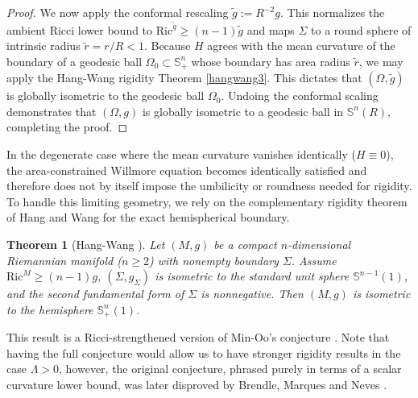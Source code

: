 \documentclass[12pt,a4paper]{amsart}
\theoremstyle{plain}
\newtheorem{theorem}{Theorem}[section]
\theoremstyle{definition}
\begin{document}
\begin{proof}
We now apply the conformal rescaling $\tilde{g} := R^{-2}g$. This normalizes the ambient Ricci lower bound to $\mathrm{Ric}^{\tilde{g}} \ge (n-1)\tilde{g}$ and maps $\Sigma$ to a round sphere of intrinsic radius $\tilde{r} = r/R < 1$. Because $H$  agrees with the mean curvature of the boundary of a geodesic ball $\Omega_0 \subset \mathbb{S}^n_+$ whose boundary has area radius $\tilde{r}$, we may apply the Hang-Wang rigidity Theorem \ref{hangwang3}. This dictates that $(\Omega, \tilde{g})$ is globally isometric to the  geodesic ball $\Omega_0$. Undoing the conformal scaling demonstrates that $(\Omega, g)$ is globally isometric to a geodesic ball in $\mathbb{S}^n(R)$, completing the proof.
\end{proof}


In the degenerate case where the mean curvature vanishes identically ($H \equiv 0$),  the area-constrained Willmore equation becomes identically satisfied and therefore does not by itself impose the umbilicity or roundness needed for rigidity.  To handle this limiting geometry, we rely on the complementary rigidity theorem of Hang and Wang for the exact hemispherical boundary.
\begin{theorem}[Hang-Wang {\cite[Theorem 2]{hang2009rigidity}}]\label{hangwang}
Let $(M,g)$ be a compact $n$-dimensional Riemannian manifold ($n\ge2$) with nonempty boundary $\Sigma$. Assume $\mathrm{Ric}^M \ge (n-1)g$, $(\Sigma,g_\Sigma)$ is isometric to the standard unit sphere $\mathbb{S}^{n-1}(1)$, and the second fundamental form of $\Sigma$ is nonnegative. Then $(M,g)$ is isometric to the hemisphere $\mathbb{S}^n_+(1)$.
\end{theorem}
This result is a Ricci-strengthened version of Min-Oo’s conjecture \cite[Theorem 4]{min1998scalar}. Note that having the full conjecture would allow us to have stronger rigidity results in the case $\Lambda >0$, however, the original conjecture, phrased purely in terms of a scalar curvature lower bound, was later disproved  by Brendle, Marques and Neves \cite{brendle2011deformations}.
\end{document}
